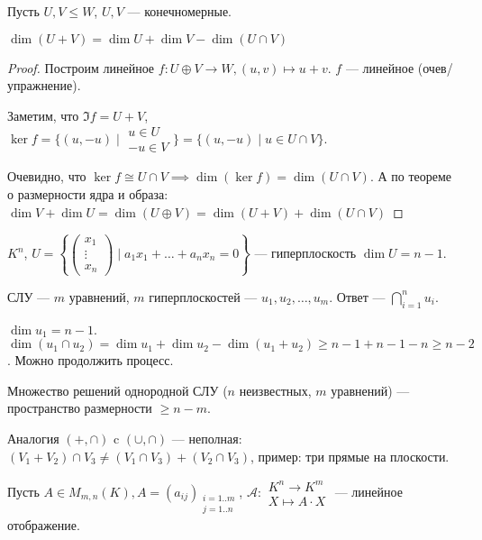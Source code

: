 \begin{theorem}
    Пусть $U, V \le W$, $U, V$ --- конечномерные.

   $\dim(U + V) = \dim U + \dim V - \dim(U \cap V)$
\end{theorem}
\begin{proof}
    Построим линейное $f\!: U \oplus V \to W, (u, v) \mapsto u + v$. $f$ --- линейное (очев/упражнение).

    Заметим, что $\Im f = U+V$,  $\ker f = \{(u, -u) \mid \begin{array}{r} u \in U \\ -u \in V \end{array} \} = \{ (u, -u) \mid u \in U \cap V \}$.

    Очевидно, что $\ker f \cong U \cap V \implies \dim (\ker f) = \dim (U \cap V)$. А по теореме о размерности ядра и образа:  $\dim V + \dim U = \dim(U \oplus V) = \dim(U + V) + \dim(U \cap V)$
\end{proof}
\begin{example}
    $K^n$, $U = \left\{ \begin{pmatrix} x_1 \\ \vdots \\ x_n \end{pmatrix} \mid a_1 x_1 + \ldots + a_n x_n = 0\right\}$ --- гиперплоскость $\dim U = n - 1$.

    СЛУ ---  $m$ уравнений,  $m$ гиперплоскостей --- $u_1, u_2, \ldots, u_m$. Ответ --- $\bigcap\limits_{i=1}^n u_i$.

    $\dim u_1 = n - 1$. $\dim (u_1 \cap u_2) = \dim u_1 + \dim u_2 - \dim (u_1 + u_2) \ge n - 1 + n - 1 - n \ge n - 2$. Можно продолжить процесс.
\end{example}
\begin{consequence}
    Множество решений однородной СЛУ ($n$ неизвестных,  $m$ уравнений) --- пространство размерности $\ge n - m$.
\end{consequence}
\begin{remark}
    Аналогия $(+, \cap)$ c  $(\cup, \cap)$ --- неполная:  $(V_1 + V_2) \cap V_3 \neq (V_1 \cap V_3) + (V_2 \cap V_3)$, пример: три прямые на плоскости.
\end{remark}

Пусть $A \in M_{m, n}(K), A = (a_{ij})_{\substack{i = 1..m \\ j = 1..n}}$,  $\mathcal{A}\!: \begin{array}{c} K^n \to K^m \\ X \mapsto A \cdot X \end{array}$ --- линейное отображение.

